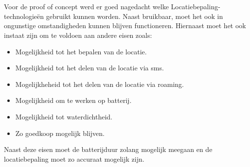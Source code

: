 \section{}
Voor de proof of concept werd er goed nagedacht welke Locatiebepaling-technologieën gebruikt kunnen worden. Naast bruikbaar, moet het ook in ongunstige omstandigheden kunnen blijven functioneren. Hiernaast moet het ook instaat zijn om te voldoen aan andere eisen zoals:
\begin{itemize}
    \item Mogelijkheid tot het bepalen van de locatie.
    \item Mogelijkheid tot het delen van de locatie via sms.
    \item Mogelijkheheid tot het delen van de locatie via roaming.
    \item Mogelijkheid om te werken op batterij.
    \item Mogelijkheid tot waterdichtheid.
    \item Zo goedkoop mogelijk blijven.
\end{itemize}
Naast deze eisen moet de batterijduur zolang mogelijk meegaan en de locatiebepaling moet zo accuraat mogelijk zijn.
